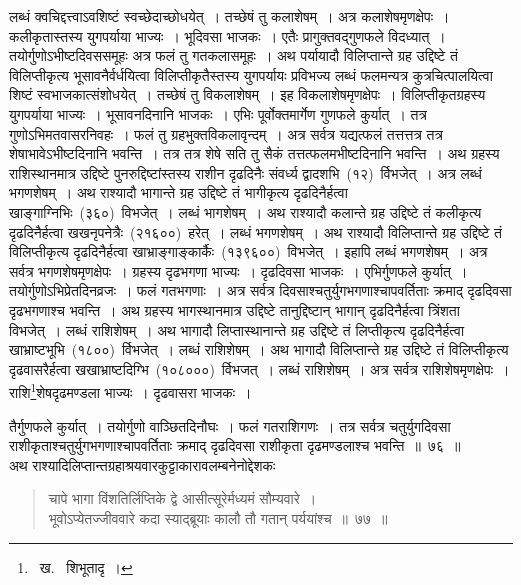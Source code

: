 \documentclass[11pt, openany]{book}
\begin{document}
\noindent
लब्धं क्वचिद्दत्त्वाऽवशिष्टं स्वच्छेदाच्छोधयेत्~। तच्छेषं तु कलाशेषम्~। अत्र कलाशेषमृणक्षेपः~। कलीकृतास्तस्य युगपर्याया भाज्यः~। भूदिवसा भाजकः~। एतैः प्रागुक्तवद्गुणफले विदध्यात्~। तयोर्गुणोऽभीष्टदिवससमूहः अत्र फलं तु गतकलासमूहः~। अथ पर्यायादौ विलिप्तान्ते ग्रह उद्दिष्टे तं विलिप्तीकृत्य भूसावनैर्वर्धयित्वा विलिप्तीकृतैस्तस्य युगपर्यायः प्रविभज्य लब्धं फलमन्यत्र कुत्रचित्पालयित्वा शिष्टं स्वभाजकात्संशोधयेत्~। तच्छेषं तु विकलाशेषम्~। इह विकलाशेषमृणक्षेपः~। विलिप्तीकृतग्रहस्य युगपर्याया भाज्यः~। भूसावनदिनानि भाजकः~। एभिः पूर्वोक्तमार्गेण गुणफले कुर्यात्~। तत्र गुणोऽभिमतवासरनिवहः~। फलं तु ग्रहभुक्तविकलावृन्दम्~। अत्र सर्वत्र यद्यत्फलं तत्तत्तत्र तत्र शेषाभावेऽभीष्टदिनानि भवन्ति~। तत्र तत्र शेषे सति तु सैकं तत्तत्फलमभीष्टदिनानि भवन्ति~। अथ ग्रहस्य राशिस्थानमात्र उद्दिष्टे पुनरुद्दिष्टांस्तस्य राशीन दृढदिनैः संवर्ध्य द्वादशभि~(१२)~र्विभजेत्~। अत्र लब्धं भगणशेषम्~। अथ राश्यादौ भागान्ते ग्रह उद्दिष्टे तं भागीकृत्य दृढदिनैर्हत्वा खाङ्गाग्निभिः~(३६०)~विभजेत्~। लब्धं भागशेषम्~। अथ राश्यादौ कलान्ते ग्रह उद्दिष्टे तं कलीकृत्य दृढदिनैर्हत्वा खखनृपनेत्रैः~(२१६००)~हरेत्~। लब्धं भगणशेषम्~। अथ राश्यादौ विलिप्तान्ते ग्रह उद्दिष्टे तं विलिप्तीकृत्य दृढदिनैर्हत्वा खाभ्राङ्गाङ्कार्कैः~(१३९६००)~विभजेत्~। इहापि लब्धं भगणशेषम्~। अत्र सर्वत्र भगणशेषमृणक्षेपः~। ग्रहस्य दृढभगणा भाज्यः~। दृढदिवसा भाजकः~। एभिर्गुणफले कुर्यात्~। तयोर्गुणोऽभिप्रेतदिनव्रजः~। फलं गतभगणाः~। अत्र सर्वत्र दिवसाश्चतुर्युगभगणाश्चापवर्तिताः क्रमाद् दृढदिवसा दृढभगणाश्च भवन्ति~। अथ ग्रहस्य भागस्थानमात्र उद्दिष्टे तानुद्दिष्टान् भागान् दृढदिनैर्हत्वा त्रिंशता विभजेत्~। लब्धं राशिशेषम्~। अथ भागादौ लिप्तास्थानान्ते ग्रह उद्दिष्टे तं लिप्तीकृत्य दृढदिनैर्हत्वा खाभ्राष्टभूभि~(१८००)~र्विभजेत्~। लब्धं राशिशेषम्~। अथ भागादौ विलिप्तान्ते ग्रह उद्दिष्टे तं विलिप्तीकृत्य दृढवासरैर्हत्वा खखाभ्राष्टदिग्भि~(१०८०००)~र्विभजत्~। लब्धं राशिशेषम्~। अत्र सर्वत्र राशिशेषमृणक्षेपः~। राशि\renewcommand\thefootnote{१}\footnote{~ख.~ शिभूतादृ~।}शेषदृढमण्डला भाज्यः~। दृढवासरा भाजकः~।


\newpage
\thispagestyle{fancy}
\fancyhf{}

\noindent
तैर्गुणफले कुर्यात्~। तयोर्गुणो वाञ्छितदिनौघः~। फलं गतराशिगणः~। तत्र सर्वत्र चतुर्युगदिवसा राशीकृताश्चतुर्युगभगणाश्चापवर्तिताः क्रमाद् दृढदिवसा राशीकृता दृढमण्डलाश्च भवन्ति~॥~७६~॥\\

अथ राश्यादिलिप्तान्तग्रहाश्रयवारकुट्टाकारावलम्बनेनोद्देशकः\textendash

\begin{quote}
{\ku चापे भागा विंशतिर्लिप्तिके द्वे आसीत्सूरेर्मध्यमं सौम्यवारे~।\\
भूवोऽप्येतज्जीववारे कदा स्याद्ब्रूयाः कालौ तौ गतान् पर्ययांश्च~॥~७७~॥}
\end{quote}
\end{document}

